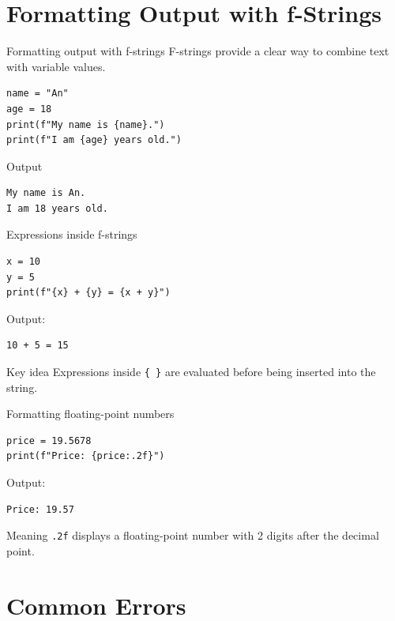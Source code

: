 \documentclass[aspectratio=169,10pt]{beamer}
\begin{document}
\section{Formatting Output with f-Strings}

\begin{frame}[fragile]{Formatting output with f-strings}
F-strings provide a clear way to combine text with variable values.
\begin{lstlisting}
name = "An"
age = 18
print(f"My name is {name}.")
print(f"I am {age} years old.")
\end{lstlisting}
\begin{block}{Output}
\begin{verbatim}
My name is An.
I am 18 years old.
\end{verbatim}
\end{block}
\end{frame}

\begin{frame}[fragile]{Expressions inside f-strings}
\begin{lstlisting}
x = 10
y = 5
print(f"{x} + {y} = {x + y}")
\end{lstlisting}
Output:
\begin{verbatim}
10 + 5 = 15
\end{verbatim}
\begin{alertblock}{Key idea}
Expressions inside \texttt{\{ \}} are evaluated before being inserted into the string.
\end{alertblock}
\end{frame}

\begin{frame}[fragile]{Formatting floating-point numbers}
\begin{lstlisting}
price = 19.5678
print(f"Price: {price:.2f}")
\end{lstlisting}
Output:
\begin{verbatim}
Price: 19.57
\end{verbatim}
\begin{block}{Meaning}
\texttt{.2f} displays a floating-point number with 2 digits after the decimal point.
\end{block}
\end{frame}

\section{Common Errors}
\end{document}
